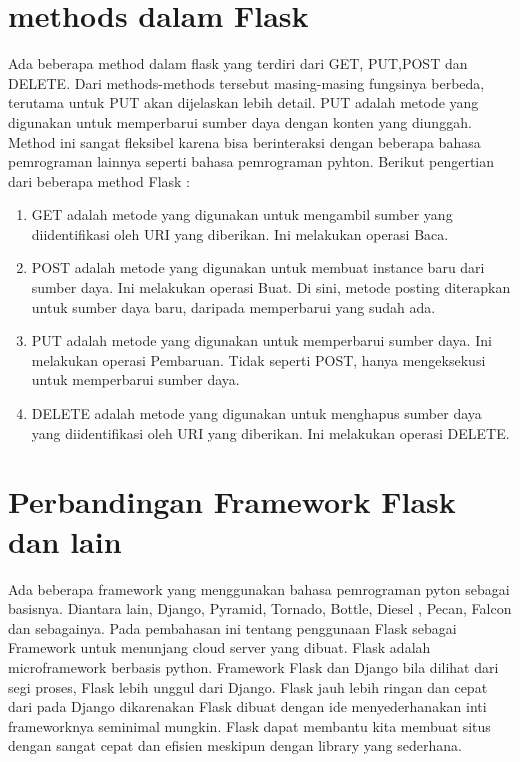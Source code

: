 \section{methods dalam Flask}
Ada beberapa method dalam flask yang terdiri dari GET, PUT,POST dan DELETE. Dari methods-methods tersebut masing-masing fungsinya berbeda, terutama untuk PUT akan dijelaskan lebih detail. PUT adalah metode yang digunakan untuk memperbarui sumber daya dengan konten yang diunggah. Method ini sangat fleksibel karena bisa berinteraksi dengan beberapa bahasa pemrograman lainnya seperti bahasa pemrograman pyhton. Berikut pengertian dari beberapa method Flask :
\begin{enumerate}
\item GET adalah metode yang digunakan untuk mengambil sumber yang diidentifikasi oleh URI yang diberikan. Ini melakukan operasi Baca.
\item POST adalah metode yang digunakan untuk membuat instance baru dari sumber daya. Ini melakukan operasi Buat. Di sini, metode posting diterapkan untuk sumber daya baru, daripada memperbarui yang sudah ada.
\item PUT adalah metode yang digunakan untuk memperbarui sumber daya. Ini melakukan operasi Pembaruan. Tidak seperti POST, hanya mengeksekusi untuk memperbarui sumber daya.
\item DELETE adalah metode yang digunakan untuk menghapus sumber daya yang diidentifikasi oleh URI yang diberikan. Ini melakukan operasi DELETE.
\end{enumerate}

\section{Perbandingan Framework Flask dan lain}
Ada beberapa framework yang menggunakan bahasa pemrograman pyton sebagai basisnya. Diantara lain, Django, Pyramid, Tornado, Bottle, Diesel , Pecan, Falcon dan sebagainya.
Pada pembahasan ini tentang penggunaan Flask sebagai Framework untuk menunjang cloud server yang dibuat. 
Flask adalah microframework berbasis python. Framework Flask dan Django bila dilihat dari segi proses, Flask lebih unggul dari Django. 
Flask jauh lebih ringan dan cepat dari pada Django dikarenakan Flask dibuat dengan ide menyederhanakan inti frameworknya seminimal mungkin. 
Flask dapat membantu kita membuat situs dengan sangat cepat dan efisien meskipun dengan library yang sederhana.

